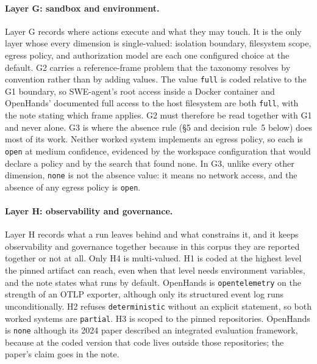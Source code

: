 
\paragraph{Layer G: sandbox and environment.}\label{subsec:layer-g}
Layer G records where actions execute and what they may touch. It is the only layer whose every
dimension is single-valued: isolation boundary, filesystem scope, egress policy, and authorization model
are each one configured choice at the default. G2 carries a reference-frame problem that the taxonomy
resolves by convention rather than by adding values. The value \texttt{full} is coded relative to the
G1 boundary, so SWE-agent's root access inside a Docker container and OpenHands' documented full access
to the host filesystem are both \texttt{full}, with the note stating which frame applies. G2 must
therefore be read together with G1 and never alone. G3 is where the absence rule
(\S5 and decision rule~5 below) does most of its work. Neither worked system implements an egress policy, so
each is \texttt{open} at medium confidence, evidenced by the workspace configuration that would declare
a policy and by the search that found none. In G3, unlike every other dimension, \texttt{none} is not
the absence value: it means no network access, and the absence of any egress policy is \texttt{open}.


\paragraph{Layer H: observability and governance.}\label{subsec:layer-h}
Layer H records what a run leaves behind and what constrains it, and it keeps observability and
governance together because in this corpus they are reported together or not at all. Only H4 is
multi-valued. H1 is coded at the highest level the pinned artifact can reach, even when that level needs
environment variables, and the note states what runs by default. OpenHands is \texttt{opentelemetry} on
the strength of an OTLP exporter, although only its structured event log runs unconditionally. H2
refuses \texttt{deterministic} without an explicit statement, so both worked systems are
\texttt{partial}. H3 is scoped to the pinned repositories. OpenHands is \texttt{none} although its 2024
paper described an integrated evaluation framework, because at the coded version that code lives outside
those repositories; the paper's claim goes in the note.

